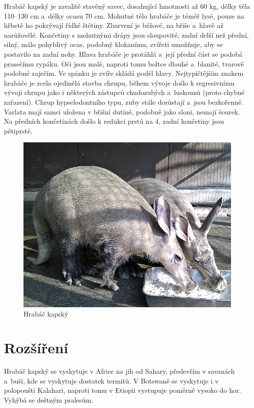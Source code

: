 \documentclass[a4paper, 12pt]{article}
\begin{document}
Hrabáč kapský je zavalitě stavěný savec, dosahující hmotnosti až 60 kg, délky těla 110--130 cm a~délky ocasu 70 cm.
Mohutné tělo hrabáče je téměř lysé, pouze na hřbetě ho pokrývají řídké štětiny.
Zbarvení je béžové, na břiše a~hlavě až narůžovělé.
Končetiny s mohutnými drápy jsou sloupovité, zadní delší než přední, silný, málo pohyblivý ocas, podobný klokanímu, zvířeti umožňuje, aby se postavilo na zadní nohy.
Hlava hrabáče je protáhlá a~její přední část se podobá prasečímu rypáku. Oči jsou malé, naproti tomu boltce dlouhé a~blanité, tvarově podobné zaječím. Ve spánku je zvíře skládá podél hlavy.
Nejtypičtějším znakem hrabáče je zcela ojedinělá stavba chrupu, během vývoje došlo k regresivnímu vývoji chrupu jako i některých zástupců chudozubých a~luskounů (proto chybné zařazení).
Chrup hypselodontního typu, zuby stále dorůstají a~jsou bezkořenné.
Varlata mají samci uložena v břišní dutině, podobně jako sloni, nemají šourek.
Na předních končetinách došlo k redukci prstů na 4, zadní končetiny jsou pětiprsté.

\begin{figure}
    \centering
    \includegraphics[width = \textwidth]{obrazky/hrabac_kapsky.jpg}
    \caption{Hrabáč kapský}
\end{figure}


\section{Rozšíření}

Hrabáč kapský se vyskytuje v Africe na jih od Sahary, především v savanách a~buši, kde se vyskytuje dostatek termitů.
V Botswaně se vyskytuje i v polopoušti Kalahari, naproti tomu v Etiopii vystupuje poměrně vysoko do hor.
Vyhýbá se deštným pralesům.
\end{document}
